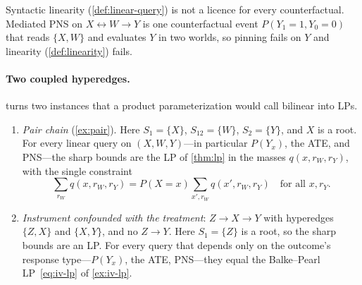 Syntactic linearity (\cref{def:linear-query}) is not a licence for every counterfactual. Mediated PNS
on $X\leftrightarrow W\to Y$ is one counterfactual event $P(Y_1{=}1,Y_0{=}0)$ that reads
$\{X,W\}$ and evaluates $Y$ in two worlds, so pinning fails on $Y$ and linearity (\cref{def:linearity}) fails.

\paragraph{Two coupled hyperedges.}
 turns two instances that a product parameterization would
call bilinear into LPs.

\begin{corollary}
\label{prop:lift}
\leavevmode
\begin{enumerate}[label=(\alph*),leftmargin=1.6em,itemsep=0.2em]
\item \emph{Pair chain} (\cref{ex:pair}). Here $S_1=\{X\}$, $S_{12}=\{W\}$,
$S_2=\{Y\}$, and $X$ is a root. For every linear query on $(X,W,Y)$---in
particular $P(Y_x)$, the ATE, and PNS---the sharp bounds are the LP of
\cref{thm:lp} in the masses $q(x,r_W,r_Y)$, with the single constraint
\begin{equation}
\label{eq:lift}
\sum_{r_W}q(x,r_W,r_Y)=P(X{=}x)\sum_{x',r_W}q(x',r_W,r_Y)
\quad\text{for all }x,r_Y.
\end{equation}
\item \emph{Instrument confounded with the treatment}: $Z\to X\to Y$ with
hyperedges $\{Z,X\}$ and $\{X,Y\}$, and no $Z\to Y$. Here $S_1=\{Z\}$ is a
root, so the sharp bounds are an LP. For every query that depends only on
the outcome's response type---$P(Y_x)$, the ATE, PNS---they equal the
Balke--Pearl LP~\eqref{eq:iv-lp} of \cref{ex:iv-lp}.
\end{enumerate}
\end{corollary}

